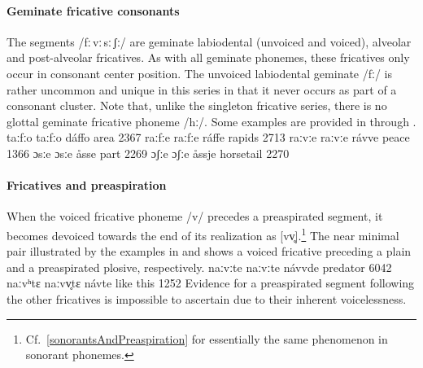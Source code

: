 \paragraph{Geminate fricative consonants}
The segments \mbox{/fː\,vː\,sː\,ʃː/} are geminate labiodental (unvoiced and voiced), alveolar and post-alveolar fricatives. As with all geminate phonemes, these fricatives only occur in consonant center position. The unvoiced labiodental geminate /fː/ is rather uncommon and unique in this series in that it never occurs as part of a consonant cluster. Note that, unlike the singleton fricative series, there is no glottal geminate fricative phoneme /hː/. Some examples are provided in  through .
	{taː{fː}o}	{taː{fː}o}	{dáffo}	{area\BS{}}		{2367}%
	{raː{fː}e}	{raː{fː}e}	{ráffe}	{rapids\BS{}}		{2713}%
	{raː{vː}e}	{raː{vː}e}	{rávve}	{peace\BS{}}		{1366}%
	{ɔ{sː}e}	{ɔ{sː}e}	{åsse}	{part\BS{}}	{2269}
	{ɔ{ʃː}e}	{ɔ{ʃː}e}	{åssje}	{horsetail\BS{}}	{2270}


\paragraph{Fricatives and preaspiration}\label{fricativesAndPreaspiration}
When the voiced fricative phoneme /v/ precedes a preaspirated segment, it becomes devoiced towards the end of its realization as [vv̥].\footnote{Cf.~\SEC\ref{sonorantsAndPreaspiration} for essentially the same phenomenon in sonorant phonemes.} 
The near minimal pair illustrated by the examples in  and  shows a voiced fricative preceding a plain and a preaspirated plosive, respectively.
	{naː{vːt}e}	{naː{vːt}e}	{návvde}	{predator\BS{}}		{6042}%
		{naː{vʰt}ɛ}	{naː{vv̥t}ɛ}	{návte}	{like this}		{1252}%
Evidence for a preaspirated segment following the other fricatives is impossible to ascertain due to their inherent voicelessness.


